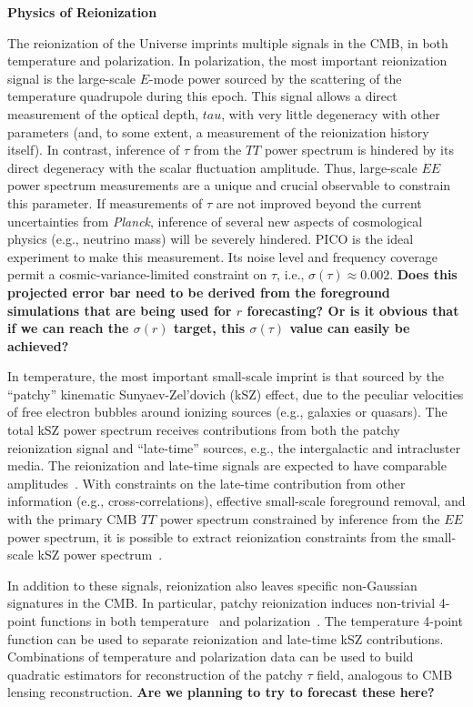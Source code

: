 \documentclass[PICOReport.tex]{subfiles}
\begin{document}

{\bf Physics of Reionization}

The reionization of the Universe imprints multiple signals in the CMB, in both temperature and polarization.  In polarization, the most important reionization signal is the large-scale $E$-mode power sourced by the scattering of the temperature quadrupole during this epoch.  This signal allows a direct measurement of the optical depth, $tau$, with very little degeneracy with other parameters (and, to some extent, a measurement of the reionization history itself).  In contrast, inference of $\tau$ from the $TT$ power spectrum is hindered by its direct degeneracy with the scalar fluctuation amplitude.  Thus, large-scale $EE$ power spectrum measurements are a unique and crucial observable to constrain this parameter.  If measurements of $\tau$ are not improved beyond the current uncertainties from {\em Planck}, inference of several new aspects of cosmological physics (e.g., neutrino mass) will be severely hindered.  PICO is the ideal experiment to make this measurement.  Its noise level and frequency coverage permit a cosmic-variance-limited constraint on $\tau$, i.e., $\sigma(\tau) \approx 0.002$.  \textbf{Does this projected error bar need to be derived from the foreground simulations that are being used for $r$ forecasting?  Or is it obvious that if we can reach the $\sigma(r)$ target, this $\sigma(\tau)$ value can easily be achieved?}

In temperature, the most important small-scale imprint is that sourced by the ``patchy'' kinematic Sunyaev-Zel'dovich (kSZ) effect, due to the peculiar velocities of free electron bubbles around ionizing sources (e.g., galaxies or quasars).  The total kSZ power spectrum receives contributions from both the patchy reionization signal and ``late-time'' sources, e.g., the intergalactic and intracluster media.  The reionization and late-time signals are expected to have comparable amplitudes~\citep{Shaw2012,MMS2012,Battaglia2013}.  With constraints on the late-time contribution from other information (e.g., cross-correlations), effective small-scale foreground removal, and with the primary CMB $TT$ power spectrum constrained by inference from the $EE$ power spectrum, it is possible to extract reionization constraints from the small-scale kSZ power spectrum~\citep{calabrese/etal/2014}.

In addition to these signals, reionization also leaves specific non-Gaussian signatures in the CMB.  In particular, patchy reionization induces non-trivial 4-point functions in both temperature~\citep{SmithFerraro2017} and polarization~\citep{DvorkinSmith2008}.  The temperature 4-point function can be used to separate reionization and late-time kSZ contributions.  Combinations of temperature and polarization data can be used to build quadratic estimators for reconstruction of the patchy $\tau$ field, analogous to CMB lensing reconstruction.  \textbf{Are we planning to try to forecast these here?}
\end{document}
